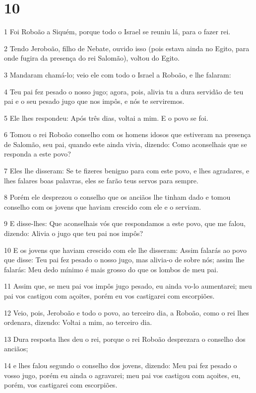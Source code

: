 \chapter{10}

\par 1 Foi Roboão a Siquém, porque todo o Israel se reuniu lá, para o fazer rei.
\par 2 Tendo Jeroboão, filho de Nebate, ouvido isso (pois estava ainda no Egito, para onde fugira da presença do rei Salomão), voltou do Egito.
\par 3 Mandaram chamá-lo; veio ele com todo o Israel a Roboão, e lhe falaram:
\par 4 Teu pai fez pesado o nosso jugo; agora, pois, alivia tu a dura servidão de teu pai e o seu pesado jugo que nos impôs, e nós te serviremos.
\par 5 Ele lhes respondeu: Após três dias, voltai a mim. E o povo se foi.
\par 6 Tomou o rei Roboão conselho com os homens idosos que estiveram na presença de Salomão, seu pai, quando este ainda vivia, dizendo: Como aconselhais que se responda a este povo?
\par 7 Eles lhe disseram: Se te fizeres benigno para com este povo, e lhes agradares, e lhes falares boas palavras, eles se farão teus servos para sempre.
\par 8 Porém ele desprezou o conselho que os anciãos lhe tinham dado e tomou conselho com os jovens que haviam crescido com ele e o serviam.
\par 9 E disse-lhes: Que aconselhais vós que respondamos a este povo, que me falou, dizendo: Alivia o jugo que teu pai nos impôs?
\par 10 E os jovens que haviam crescido com ele lhe disseram: Assim falarás ao povo que disse: Teu pai fez pesado o nosso jugo, mas alivia-o de sobre nós; assim lhe falarás: Meu dedo mínimo é mais grosso do que os lombos de meu pai.
\par 11 Assim que, se meu pai vos impôs jugo pesado, eu ainda vo-lo aumentarei; meu pai vos castigou com açoites, porém eu vos castigarei com escorpiões.
\par 12 Veio, pois, Jeroboão e todo o povo, ao terceiro dia, a Roboão, como o rei lhes ordenara, dizendo: Voltai a mim, ao terceiro dia.
\par 13 Dura resposta lhes deu o rei, porque o rei Roboão desprezara o conselho dos anciãos;
\par 14 e lhes falou segundo o conselho dos jovens, dizendo: Meu pai fez pesado o vosso jugo, porém eu ainda o agravarei; meu pai vos castigou com açoites, eu, porém, vos castigarei com escorpiões.

